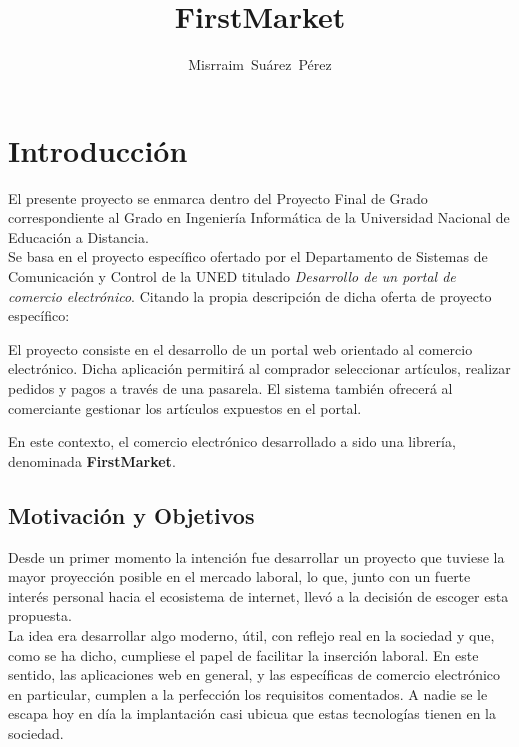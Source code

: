 \documentclass[a4paper]{report}
\author{Misrraim~Su\'arez~P\'erez}
\title{FirstMarket}
\begin{document}
    \maketitle
    \tableofcontents

    \section{Introducción}
    El presente proyecto se enmarca dentro del Proyecto Final de Grado correspondiente al Grado en Ingeniería Informática de la Universidad Nacional de Educación a Distancia.
    \\
    
    Se basa en el proyecto específico ofertado por el Departamento de Sistemas de Comunicación y Control de la UNED titulado \emph{Desarrollo de un portal de comercio electrónico}. Citando la propia descripción de dicha oferta de proyecto específico:
    
    \begin{displayquote}
        El proyecto consiste en el desarrollo de un portal web orientado al comercio electrónico.
        Dicha aplicación permitirá al comprador seleccionar artículos, realizar pedidos y pagos a través de una pasarela.
        El sistema también ofrecerá al comerciante gestionar los artículos expuestos en el portal.
    \end{displayquote}

	En este contexto, el comercio electrónico desarrollado a sido una librería, denominada \textbf{FirstMarket}.

    \subsection{Motivación y Objetivos}
    Desde un primer momento la intención fue desarrollar un proyecto que tuviese la mayor proyección posible en el mercado laboral, lo que, junto con un fuerte interés personal hacia el ecosistema de internet, llevó a la decisión de escoger esta propuesta.
    \\
    
    La idea era desarrollar algo moderno, útil, con reflejo real en la sociedad y que, como se ha dicho, cumpliese el papel de facilitar la inserción laboral. En este sentido, las aplicaciones web en general, y las específicas de comercio electrónico en particular, cumplen a la perfección los requisitos comentados. A nadie se le escapa hoy en día la implantación casi ubicua que estas tecnologías tienen en la sociedad.
    \\
\end{document}
